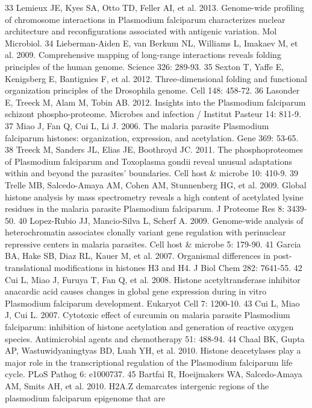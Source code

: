 33  Lemieux JE, Kyes SA, Otto TD, Feller AI, et al. 2013. Genome-wide
profiling of chromosome interactions in Plasmodium falciparum characterizes
nuclear architecture and reconfigurations associated with antigenic variation.
Mol Microbiol.
34  Lieberman-Aiden E, van Berkum NL, Williams L, Imakaev M, et al. 2009.
Comprehensive mapping of long-range interactions reveals folding principles of
the human genome. Science 326: 289-93.
35  Sexton T, Yaffe E, Kenigsberg E, Bantignies F, et al. 2012.
Three-dimensional folding and functional organization principles of the
Drosophila genome. Cell 148: 458-72.
36  Lasonder E, Treeck M, Alam M, Tobin AB. 2012. Insights into the Plasmodium
falciparum schizont phospho-proteome. Microbes and infection / Institut
Pasteur 14: 811-9.
37  Miao J, Fan Q, Cui L, Li J. 2006. The malaria parasite Plasmodium
falciparum histones: organization, expression, and acetylation. Gene 369:
53-65.
38  Treeck M, Sanders JL, Elias JE, Boothroyd JC. 2011. The phosphoproteomes
of Plasmodium falciparum and Toxoplasma gondii reveal unusual adaptations
within and beyond the parasites' boundaries. Cell host \& microbe 10: 410-9.
39  Trelle MB, Salcedo-Amaya AM, Cohen AM, Stunnenberg HG, et al. 2009. Global
histone analysis by mass spectrometry reveals a high content of acetylated
lysine residues in the malaria parasite Plasmodium falciparum. J Proteome Res
8: 3439-50.
40  Lopez-Rubio JJ, Mancio-Silva L, Scherf A. 2009. Genome-wide analysis of
heterochromatin associates clonally variant gene regulation with perinuclear
repressive centers in malaria parasites. Cell host \& microbe 5: 179-90.
41  Garcia BA, Hake SB, Diaz RL, Kauer M, et al. 2007. Organismal differences
in post-translational modifications in histones H3 and H4. J Biol Chem 282:
7641-55.
42  Cui L, Miao J, Furuya T, Fan Q, et al. 2008. Histone acetyltransferase
inhibitor anacardic acid causes changes in global gene expression during in
vitro Plasmodium falciparum development. Eukaryot Cell 7: 1200-10.
43  Cui L, Miao J, Cui L. 2007. Cytotoxic effect of curcumin on malaria
parasite Plasmodium falciparum: inhibition of histone acetylation and
generation of reactive oxygen species. Antimicrobial agents and chemotherapy
51: 488-94.
44  Chaal BK, Gupta AP, Wastuwidyaningtyas BD, Luah YH, et al. 2010. Histone
deacetylases play a major role in the transcriptional regulation of the
Plasmodium falciparum life cycle. PLoS Pathog 6: e1000737.
45  Bartfai R, Hoeijmakers WA, Salcedo-Amaya AM, Smits AH, et al. 2010. H2A.Z
demarcates intergenic regions of the plasmodium falciparum epigenome that are
